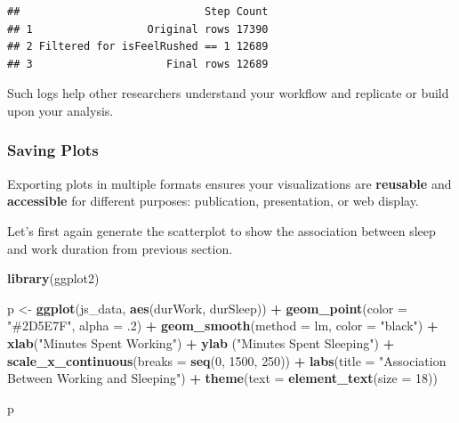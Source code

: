 \documentclass[
]{article}
\newenvironment{Shaded}{\begin{snugshade}}{\end{snugshade}}
\newcommand{\AttributeTok}[1]{\textcolor[rgb]{0.13,0.29,0.53}{#1}}
\newcommand{\DecValTok}[1]{\textcolor[rgb]{0.00,0.00,0.81}{#1}}
\newcommand{\FunctionTok}[1]{\textcolor[rgb]{0.13,0.29,0.53}{\textbf{#1}}}
\newcommand{\NormalTok}[1]{#1}
\newcommand{\OtherTok}[1]{\textcolor[rgb]{0.56,0.35,0.01}{#1}}
\newcommand{\SpecialCharTok}[1]{\textcolor[rgb]{0.81,0.36,0.00}{\textbf{#1}}}
\newcommand{\StringTok}[1]{\textcolor[rgb]{0.31,0.60,0.02}{#1}}
\begin{document}
\begin{verbatim}
##                             Step Count
## 1                  Original rows 17390
## 2 Filtered for isFeelRushed == 1 12689
## 3                     Final rows 12689
\end{verbatim}

Such logs help other researchers understand your workflow and replicate
or build upon your analysis.

\subsubsection{Saving Plots}\label{saving-plots}

Exporting plots in multiple formats ensures your visualizations are
\textbf{reusable} and \textbf{accessible} for different purposes:
publication, presentation, or web display.

Let's first again generate the scatterplot to show the association
between sleep and work duration from previous section.

\begin{Shaded}
\begin{Highlighting}[]
\FunctionTok{library}\NormalTok{(ggplot2)}

\NormalTok{p }\OtherTok{\textless{}{-}} \FunctionTok{ggplot}\NormalTok{(js\_data, }\FunctionTok{aes}\NormalTok{(durWork, durSleep)) }\SpecialCharTok{+}
  \FunctionTok{geom\_point}\NormalTok{(}\AttributeTok{color =} \StringTok{"\#2D5E7F"}\NormalTok{, }\AttributeTok{alpha =}\NormalTok{ .}\DecValTok{2}\NormalTok{) }\SpecialCharTok{+}
  \FunctionTok{geom\_smooth}\NormalTok{(}\AttributeTok{method =}\NormalTok{ lm, }\AttributeTok{color =} \StringTok{"black"}\NormalTok{) }\SpecialCharTok{+}
  \FunctionTok{xlab}\NormalTok{(}\StringTok{"Minutes Spent Working"}\NormalTok{) }\SpecialCharTok{+}
  \FunctionTok{ylab}\NormalTok{ (}\StringTok{"Minutes Spent Sleeping"}\NormalTok{) }\SpecialCharTok{+}
  \FunctionTok{scale\_x\_continuous}\NormalTok{(}\AttributeTok{breaks =} \FunctionTok{seq}\NormalTok{(}\DecValTok{0}\NormalTok{, }\DecValTok{1500}\NormalTok{, }\DecValTok{250}\NormalTok{)) }\SpecialCharTok{+}
  \FunctionTok{labs}\NormalTok{(}\AttributeTok{title =} \StringTok{"Association Between Working and Sleeping"}\NormalTok{) }\SpecialCharTok{+}
  \FunctionTok{theme}\NormalTok{(}\AttributeTok{text =} \FunctionTok{element\_text}\NormalTok{(}\AttributeTok{size =} \DecValTok{18}\NormalTok{))}

\NormalTok{p}
\end{Highlighting}
\end{Shaded}
\end{document}
